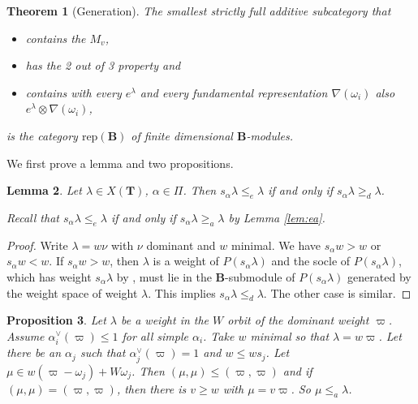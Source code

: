 \documentclass[sn-mathphys-num]{sn-jnl}%
\newcommand{\rep}{{\mathrm{rep}}}
\newcommand{\fb}{\mathbf B}
\newcommand{\bt}{\mathbf T}
\newtheorem{theorem}{Theorem}[section]
\newtheorem{lemma}[theorem]{Lemma}
\newtheorem{proposition}[theorem]{Proposition}
\theoremstyle{definition}
\begin{document}
  \begin{theorem}[Generation]\label{th:generation}
  The smallest strictly full additive subcategory  that 
  \begin{itemize}
  \item contains the $M_v$,  
  \item has the
  2 out of 3 property and 
  \item contains with every $e^\lambda$ and every fundamental representation $\nabla(\omega_i)$ also
   $e^\lambda\otimes\nabla(\omega_i)$,
  \end{itemize}
   is the category $\rep({\fb})$ of finite dimensional ${\fb}$-modules.
  \end{theorem}
  
We first prove a lemma and two propositions.
   \begin{lemma}\label{lem:aed}
    Let $\lambda\in X(\bt)$, $\alpha\in \Pi$.
    Then $s_\alpha\lambda\leq_e\lambda$ if and only if $s_\alpha\lambda\geq_d\lambda$.
    
    Recall that $s_\alpha\lambda\leq_e\lambda$ if and only if $s_\alpha\lambda\geq_a\lambda$ by Lemma \ref{lem:ea}.
\end{lemma}
\begin{proof}
    Write $\lambda=w\nu$ with $\nu$
    dominant and $w$ minimal. We have $s_\alpha w>w$ or $s_\alpha w<w$. If $s_\alpha w>w$, then $\lambda$ is a weight of $P(s_\alpha\lambda)$ and the socle of $P(s_\alpha\lambda)$, which has weight $s_\alpha\lambda$ by \cite[Lemma 2.2.9]{WvdKTata}, must lie in the $\fb$-submodule of $P(s_\alpha\lambda)$
    generated by the weight space of weight $\lambda$. This implies
$s_\alpha\lambda\leq_d\lambda$. The other case is similar.
\end{proof}
   \begin{proposition}\label{prop:touch}
  Let $\lambda$ be a weight in the $W$ orbit of the dominant weight $\varpi$. 
  Assume $\alpha_i^\vee(\varpi)\leq1$ for all
  simple $\alpha_i$. 
  Take $w$ minimal so that $\lambda=w\varpi$. Let there be an $\alpha_j$  such that $\alpha_j^\vee(\varpi)=1$ and 
  $w\leq w s_j$. Let $\mu\in w(\varpi-\omega_j)+W\omega_j$. Then $(\mu,\mu)\leq (\varpi,\varpi)$ and if $(\mu,\mu)=(\varpi,\varpi)$,
  then there is $v\geq w$ with $\mu=v\varpi$.
  So $\mu\leq_a\lambda$.
  \end{proposition}
\end{document}
